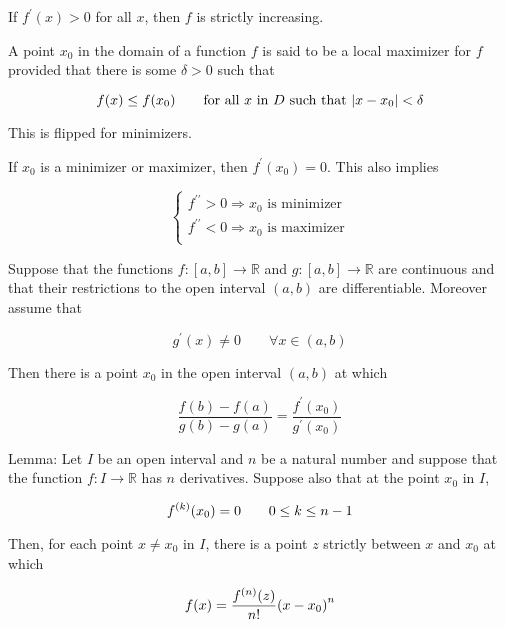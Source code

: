 \begin{thm}
    If $f^\prime(x) > 0$ for all $x$, then $f$ is strictly increasing.
\end{thm}

\begin{thm}
    A point $x_0$ in the domain of a function $f$ is said to be a local maximizer for $f$ provided that there is some
    $\delta > 0$ such that

    \[
        f(x) \le f(x_0) \qquad \text{for all $x$ in $D$ such that } {\left\lvert x - x_0 \right\rvert} < \delta
    \]

    This is flipped for minimizers.

    If $x_0$ is a minimizer or maximizer, then $f^\prime(x_0) = 0$. This also implies

    \[
        \begin{cases}
            f^{\prime\prime} > 0 \Rightarrow x_0 \text{ is minimizer}\\
            f^{\prime\prime} < 0 \Rightarrow x_0 \text{ is maximizer}\\
        \end{cases}
    \]
\end{thm}

\begin{thm}
    Suppose that the functions $f:[a, b]\to\mathbb{R}$ and $g:[a, b]\to\mathbb{R}$ are continuous and that their
    restrictions to the open interval $(a, b)$ are differentiable. Moreover assume that

    \[ g^\prime(x) \neq 0 \qquad \forall x \in (a, b) \]

    Then there is a point $x_0$ in the open interval $(a, b)$ at which

    \[
        \frac{f(b) - f(a)}{g(b) - g(a)} = \frac{f^\prime(x_0)}{g^\prime(x_0)}
    \]

    Lemma: Let $I$ be an open interval and $n$ be a natural number and suppose that the function $f:I\to\mathbb{R}$ has
    $n$ derivatives. Suppose also that at the point $x_0$ in $I$,

    \[ f^{\left( k \right)}(x_0) = 0 \qquad 0 \le k \le n - 1 \]

    Then, for each point $x \neq x_0$ in $I$, there is a point $z$ strictly between $x$ and $x_0$ at which

    \[ f(x) = \frac{f^{\left( n \right)}(z)}{n!}{\left( x-x_0 \right)}^n \]
\end{thm}

